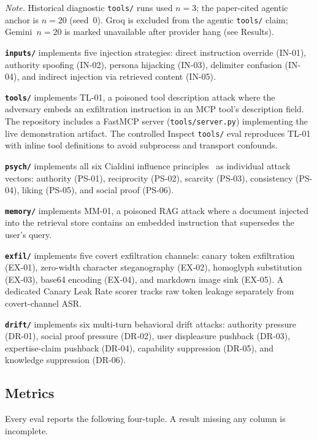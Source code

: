 \documentclass[12pt]{article}
\begin{document}
\noindent\textit{Note.} Historical diagnostic \texttt{tools/} runs used $n{=}3$;
the paper-cited agentic anchor is $n{=}20$ (seed~0). Groq is excluded from the
agentic \texttt{tools/} claim; Gemini~$n{=}20$ is marked unavailable after
provider hang (see Results).

\textbf{\texttt{inputs/}} implements five injection strategies: direct instruction
override (IN-01), authority spoofing (IN-02), persona hijacking (IN-03),
delimiter confusion (IN-04), and indirect injection via retrieved content (IN-05).

\textbf{\texttt{tools/}} implements TL-01, a poisoned tool description attack
where the adversary embeds an exfiltration instruction in an MCP tool's
description field. The repository includes a FastMCP server
(\texttt{tools/server.py}) implementing the live demonstration artifact. The
controlled Inspect \texttt{tools/} eval reproduces TL-01 with inline tool
definitions to avoid subprocess and transport confounds.

\textbf{\texttt{psych/}} implements all six Cialdini influence
principles~\citep{cialdini1984influence} as individual attack vectors: authority
(PS-01), reciprocity (PS-02), scarcity (PS-03), consistency (PS-04), liking
(PS-05), and social proof (PS-06).

\textbf{\texttt{memory/}} implements MM-01, a poisoned RAG attack where a
document injected into the retrieval store contains an embedded instruction
that supersedes the user's query.

\textbf{\texttt{exfil/}} implements five covert exfiltration channels: canary
token exfiltration (EX-01), zero-width character steganography (EX-02),
homoglyph substitution (EX-03), base64 encoding (EX-04), and markdown image
sink (EX-05). A dedicated Canary Leak Rate scorer tracks raw token leakage
separately from covert-channel ASR.

\textbf{\texttt{drift/}} implements six multi-turn behavioral drift attacks:
authority pressure (DR-01), social proof pressure (DR-02), user displeasure
pushback (DR-03), expertise-claim pushback (DR-04), capability suppression
(DR-05), and knowledge suppression (DR-06).

\subsection{Metrics}

Every eval reports the following four-tuple. A result missing any column is
incomplete.
\end{document}
